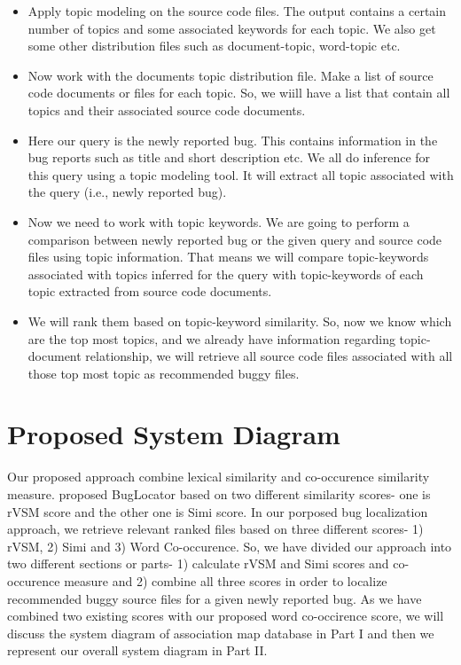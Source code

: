 \documentclass[conference]{IEEEtran}
\begin{document}
\begin{itemize}
	\item Apply topic modeling on the source code files. The output contains a certain number of topics and some associated keywords for each topic. We also get some other distribution files such as document-topic, word-topic etc.
	\item Now work with the documents topic distribution file. Make a list of source code documents or files for each topic. So, we wiill have a list that contain all topics and their associated source code documents.
	\item Here our query is the newly reported bug. This contains information in the bug reports such as title and short description etc. We all do inference for this query using a topic modeling tool. It will extract all topic associated with the query (i.e., newly reported bug).
	\item Now we need to work with topic keywords. We are going to perform a comparison between newly reported bug or the given query and source code files using topic information. That means we will compare topic-keywords associated with topics inferred for the query with topic-keywords of each topic extracted from source code documents.
	\item We will rank them based on topic-keyword similarity. So, now we know which are the top most topics, and we already have information regarding topic-document relationship, we will retrieve all source code files associated with all those top most topic as recommended buggy files.
\end{itemize}
\section{Proposed System Diagram}\label{sec:proposedsystemDiagram}
Our proposed approach combine lexical similarity and co-occurence similarity measure.  \citet{Jian} proposed BugLocator based on two different similarity scores- one is rVSM score and the other one is Simi score. In our porposed bug localization approach, we retrieve relevant ranked files based on three different scores- 1) rVSM, 2) Simi and 3) Word Co-occurence. So,
we have divided our approach into two different sections or parts- 1) calculate rVSM and Simi scores and co-occurence measure and 2) combine all three scores in order to localize recommended buggy source files for a given newly reported bug. As we have combined two existing scores with our proposed word co-occirence score, we will discuss the system diagram of association map database in Part I and then we represent our overall system diagram in Part II.
\end{document}
